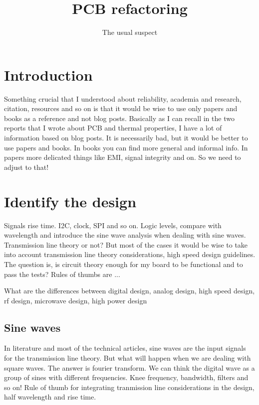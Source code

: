 \documentclass[12pt]{article}
\title{PCB refactoring}
\author{The usual suspect}
\date{}
\begin{document}
\maketitle
\tableofcontents{}
\pagebreak

\section{Introduction}

Something crucial that I understood about reliability, academia and research, citation, resources and so on is that it would be wise to use only papers and books as a reference and not blog posts. Basically as I can recall in the two reports that I wrote about PCB and thermal properties, I have a lot of information based on blog posts. It is necessarily bad, but it would be better to use papers and books. In books you can find more general and informal info. In papers more delicated things like EMI, signal integrity and on. So we need to adjust to that!

\section{Identify the design}

Signals rise time. I2C, clock, SPI and so on. Logic levels, compare with wavelength and introduce the sine wave analysis when dealing with sine waves. Transmission line theory or not? But most of the cases it would be wise to take into account transmission line theory considerations, high speed design guidelines. The question is, is circuit theory enough for my board to be functional and to pass the tests? Rules of thumbs are ...

What are the differences between digital design, analog design, high speed design, rf design, microwave design, high power design

\subsection{Sine waves}

In literature and most of the technical articles, sine waves are the input signals for the transmission line theory. But what will happen when we are dealing with square waves. The answer is fourier transform. We can think the digital wave as a group of sines with different frequencies. Knee frequency, bandwidth, filters and so on! Rule of thumb for integrating tranmission line considerations in the design, half wavelength and rise time.
\end{document}
